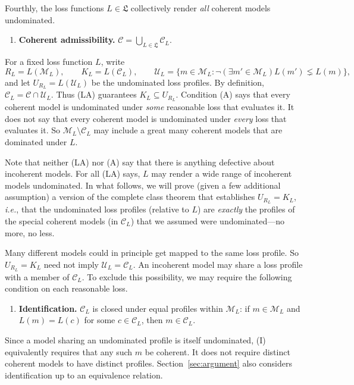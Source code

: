 \documentclass[11pt]{article}
\theoremstyle{definition}
\theoremstyle{remark}
\newcommand{\M}{\mathcal M}
\newcommand{\C}{\mathcal C}
\newcommand{\U}{\mathcal U}
\begin{document}
Fourthly, the loss functions $L\in\mathfrak L$ collectively render \textit{all} coherent models undominated.


\begin{enumerate}[label=\textbf{(A)},leftmargin=*]
\item \textbf{Coherent admissibility.} $\C=\bigcup_{L\in\mathfrak L}\C_L$.
\end{enumerate}


For a fixed loss function $L$, write
\[
 R_L=L(\M_L),\qquad K_L=L(\C_L),\qquad
 \U_L=\{m\in\M_L:\neg(\exists m'\in\M_L)L(m')\lneq L(m)\},
\]
and let $U_{R_L}=L(\U_L)$ be the undominated loss profiles. By definition, $\C_L=\C\cap\U_L$. Thus (LA) guarantees $K_L\subseteq U_{R_L}$. Condition (A) says that every coherent model is undominated under \emph{some} reasonable loss that evaluates it. It does not say that every coherent model is undominated under \textit{every} loss that evaluates it. So $\M_L\setminus\C_L$ may include a great many coherent models that are dominated under $L$.

Note that neither (LA) nor (A) say that there is anything defective about incoherent models. For all (LA) says, $L$ may render a wide range of incoherent models undominated. In what follows, we will prove (given a few additional assumption) a version of the complete class theorem that establishes $U_{R_L}=K_L$, \textit{i.e.}, that the undominated loss profiles (relative to $L$) are \textit{exactly} the profiles of the special coherent models (in $\C_L$) that we assumed were undominated---no more, no less.



Many different models could in principle get mapped to the same loss profile. So $U_{R_L}=K_L$ need not imply $\U_L=\C_L$. An incoherent model may share a loss profile with a member of $\C_L$. To exclude this possibility, we may require the following condition on each reasonable loss.
\begin{enumerate}[label=\textbf{(I)},leftmargin=*]
\item \textbf{Identification.} $\C_L$ is closed under equal profiles within $\M_L$: if $m\in\M_L$ and $L(m)=L(c)$ for some $c\in\C_L$, then $m\in\C_L$.
\end{enumerate}
Since a model sharing an undominated profile is itself undominated, (I) equivalently requires that any such $m$ be coherent. It does not require distinct coherent models to have distinct profiles. Section~\ref{sec:argument} also considers identification up to an equivalence relation.
\end{document}
